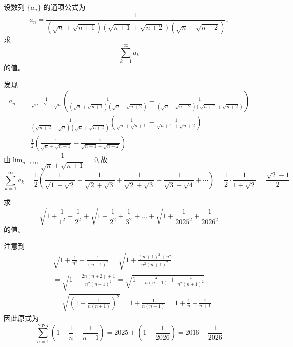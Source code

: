 \begin{questions}
    \question 设数列 $\{a_n\}$ 的通项公式为
    \[
    a_n = \frac{1}{(\sqrt{n}+\sqrt{n+1})(\sqrt{n+1}+\sqrt{n+2})(\sqrt{n}+\sqrt{n+2})},
    \]
    求 
    \[
    \sum_{k=1}^{\infty} a_k
    \]
    的值。
    \begin{solution}
        发现
        \begin{align*}
        a_n &= \frac{1}{\sqrt{n+2}-\sqrt{n}} \left( \frac{1}{(\sqrt{n}+\sqrt{n+1})(\sqrt{n}+\sqrt{n+2})} - \frac{1}{(\sqrt{n}+\sqrt{n+2})(\sqrt{n+1}+\sqrt{n+2})} \right) \\
        &= \frac{1}{(\sqrt{n+2}-\sqrt{n})(\sqrt{n}+\sqrt{n+2})} \left( \frac{1}{\sqrt{n}+\sqrt{n+1}} - \frac{1}{\sqrt{n+1}+\sqrt{n+2}} \right) \\
        &= \frac{1}{2} \left( \frac{1}{\sqrt{n}+\sqrt{n+1}} - \frac{1}{\sqrt{n+1}+\sqrt{n+2}} \right)
        \end{align*}
        由$\lim_{n \to \infty} \dfrac{1}{\sqrt{n}+\sqrt{n+1}}=0,$故
        \[
        \sum_{k=1}^{\infty} a_k = \frac{1}{2} \left( \frac{1}{\sqrt{1}+\sqrt{2}} - \frac{1}{\sqrt{2}+\sqrt{3}} + \frac{1}{\sqrt{2}+\sqrt{3}} - \frac{1}{\sqrt{3}+\sqrt{4}} + \cdots \right)
        = \frac{1}{2} \cdot \frac{1}{1+\sqrt{2}} = \frac{\sqrt{2}-1}{2}
        \]
    \end{solution}
    
    \question 求 
    \[
    \sqrt{1+\frac{1}{1^{2}}+\frac{1}{2^{2}}}+\sqrt{1+\frac{1}{2^{2}}+\frac{1}{3^{2}}}+\dots+\sqrt{1+\frac{1}{2025^{2}}+\frac{1}{2026^{2}}}
    \]
    的值。
    \begin{solution}
        注意到
        \begin{align*}
        &\sqrt{1+\frac{1}{n^2} +\frac{1}{(n+1)^2}} 
        = \sqrt{1+\frac{(n+1)^2+n^2}{n^2(n+1)^2} } \\
        &= \sqrt{1+\frac{2n(n+2) +1}{n^2(n+1)^2} } 
        = \sqrt{1+\frac{2}{n(n+1)} +\frac{1}{n^2(n+1)^2} } \\
        &= \sqrt{\left(1+\frac{1}{n(n+1)}\right)^2} 
        = 1+\frac{1}{n(n+1)} 
        = 1+\frac{1}{n}-\frac{1}{n+1}
        \end{align*}
        因此原式为
        \[
        \sum_{n=1}^{2025} \left(1 + \frac{1}{n} - \frac{1}{n+1}\right)= 2025 + \left(1 - \frac{1}{2026} \right)=2016-\frac{1}{2026}
        \]
    \end{solution}


\end{questions}
